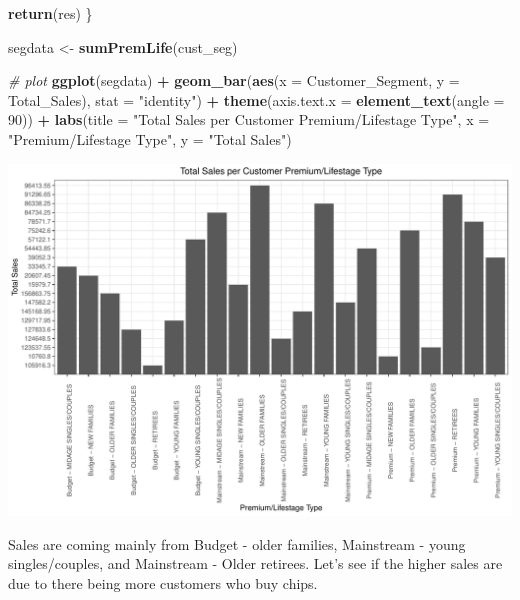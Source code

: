 \documentclass[
]{article}
\newenvironment{Shaded}{\begin{snugshade}}{\end{snugshade}}
\newcommand{\AttributeTok}[1]{\textcolor[rgb]{0.13,0.29,0.53}{#1}}
\newcommand{\CommentTok}[1]{\textcolor[rgb]{0.56,0.35,0.01}{\textit{#1}}}
\newcommand{\DecValTok}[1]{\textcolor[rgb]{0.00,0.00,0.81}{#1}}
\newcommand{\FunctionTok}[1]{\textcolor[rgb]{0.13,0.29,0.53}{\textbf{#1}}}
\newcommand{\NormalTok}[1]{#1}
\newcommand{\OtherTok}[1]{\textcolor[rgb]{0.56,0.35,0.01}{#1}}
\newcommand{\SpecialCharTok}[1]{\textcolor[rgb]{0.81,0.36,0.00}{\textbf{#1}}}
\newcommand{\StringTok}[1]{\textcolor[rgb]{0.31,0.60,0.02}{#1}}
\begin{document}
\begin{Shaded}
\begin{Highlighting}[]
  \FunctionTok{return}\NormalTok{(res)}
\NormalTok{\}}

\NormalTok{segdata }\OtherTok{\textless{}{-}} \FunctionTok{sumPremLife}\NormalTok{(cust\_seg)}


\CommentTok{\# plot}
\FunctionTok{ggplot}\NormalTok{(segdata) }\SpecialCharTok{+} \FunctionTok{geom\_bar}\NormalTok{(}\FunctionTok{aes}\NormalTok{(}\AttributeTok{x =}\NormalTok{ Customer\_Segment, }\AttributeTok{y =}\NormalTok{ Total\_Sales), }\AttributeTok{stat =} \StringTok{"identity"}\NormalTok{) }\SpecialCharTok{+} \FunctionTok{theme}\NormalTok{(}\AttributeTok{axis.text.x =} \FunctionTok{element\_text}\NormalTok{(}\AttributeTok{angle =} \DecValTok{90}\NormalTok{)) }\SpecialCharTok{+} \FunctionTok{labs}\NormalTok{(}\AttributeTok{title =} \StringTok{"Total Sales per Customer Premium/Lifestage Type"}\NormalTok{, }\AttributeTok{x =} \StringTok{"Premium/Lifestage Type"}\NormalTok{, }\AttributeTok{y =} \StringTok{"Total Sales"}\NormalTok{)}
\end{Highlighting}
\end{Shaded}

\begin{center}\includegraphics{template_files/figure-latex/unnamed-chunk-11-1} \end{center}

Sales are coming mainly from Budget - older families, Mainstream - young
singles/couples, and Mainstream - Older retirees. Let's see if the
higher sales are due to there being more customers who buy chips.
\end{document}
